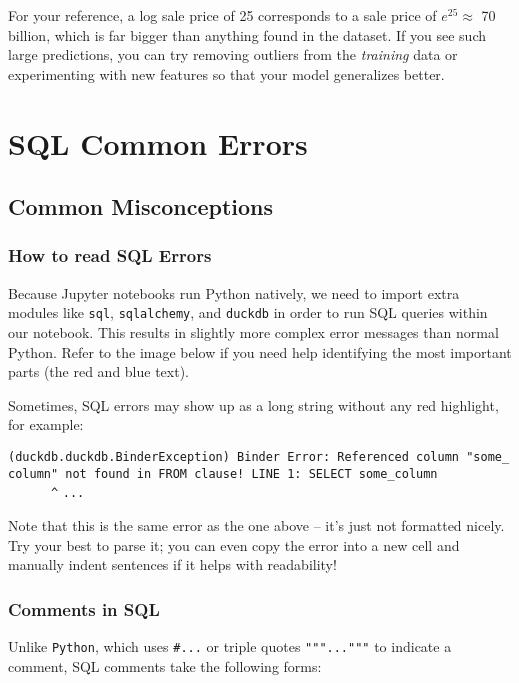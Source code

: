 \documentclass[
  letterpaper,
  DIV=11,
  numbers=noendperiod]{scrreprt}
\begin{document}
For your reference, a log sale price of 25 corresponds to a sale price
of \(e^{25} \approx\) 70 billion, which is far bigger than anything
found in the dataset. If you see such large predictions, you can try
removing outliers from the \emph{training} data or experimenting with
new features so that your model generalizes better.


\chapter{SQL Common Errors}\label{sql-common-errors}

\section{Common Misconceptions}\label{common-misconceptions}

\subsection{How to read SQL Errors}\label{how-to-read-sql-errors}

Because Jupyter notebooks run Python natively, we need to import extra
modules like \texttt{sql}, \texttt{sqlalchemy}, and \texttt{duckdb} in
order to run SQL queries within our notebook. This results in slightly
more complex error messages than normal Python. Refer to the image below
if you need help identifying the most important parts (the red and blue
text).

Sometimes, SQL errors may show up as a long string without any red
highlight, for example:

\texttt{(duckdb.duckdb.BinderException)\ Binder\ Error:\ Referenced\ column\ "some\_column"\ not\ found\ in\ FROM\ clause!\ LINE\ 1:\ SELECT\ some\_column\ \ \ \ \ \ \ \ \ \ \ \ \ \ \ \ \^{}}
\texttt{...}

Note that this is the same error as the one above -- it's just not
formatted nicely. Try your best to parse it; you can even copy the error
into a new cell and manually indent sentences if it helps with
readability!

\subsection{Comments in SQL}\label{comments-in-sql}

Unlike \texttt{Python}, which uses \texttt{\#...} or triple quotes
\texttt{"""..."""} to indicate a comment, SQL comments take the
following forms:
\end{document}
